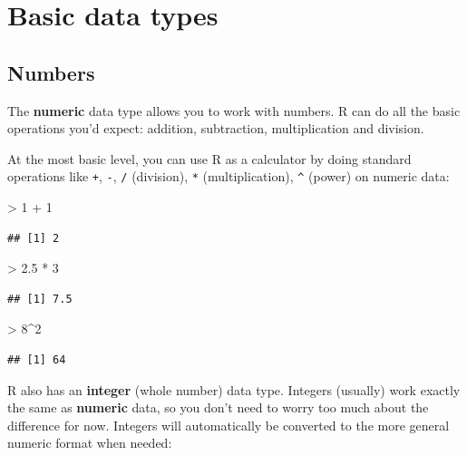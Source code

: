 \documentclass[
]{book}
\newenvironment{Shaded}{\begin{snugshade}}{\end{snugshade}}
\newcommand{\DecValTok}[1]{\textcolor[rgb]{0.00,0.00,0.81}{#1}}
\newcommand{\FloatTok}[1]{\textcolor[rgb]{0.00,0.00,0.81}{#1}}
\newcommand{\SpecialCharTok}[1]{\textcolor[rgb]{0.00,0.00,0.00}{#1}}
\begin{document}
\hypertarget{basic-data-types}{%
\section{Basic data types}\label{basic-data-types}}

\hypertarget{numbers}{%
\subsection{Numbers}\label{numbers}}

The \textbf{numeric} data type allows you to work with numbers. R can
do all the basic operations you'd expect: addition, subtraction,
multiplication and division.

At the most basic level, you can use R as a calculator by doing
standard operations like \texttt{+}, \texttt{-}, \texttt{/} (division), \texttt{*} (multiplication),
\texttt{\^{}} (power) on numeric data:

\begin{Shaded}
\begin{Highlighting}[]
\SpecialCharTok{\textgreater{}} \DecValTok{1} \SpecialCharTok{+} \DecValTok{1}
\end{Highlighting}
\end{Shaded}

\begin{verbatim}
## [1] 2
\end{verbatim}

\begin{Shaded}
\begin{Highlighting}[]
\SpecialCharTok{\textgreater{}} \FloatTok{2.5} \SpecialCharTok{*} \DecValTok{3}
\end{Highlighting}
\end{Shaded}

\begin{verbatim}
## [1] 7.5
\end{verbatim}

\begin{Shaded}
\begin{Highlighting}[]
\SpecialCharTok{\textgreater{}} \DecValTok{8}\SpecialCharTok{\^{}}\DecValTok{2}
\end{Highlighting}
\end{Shaded}

\begin{verbatim}
## [1] 64
\end{verbatim}

R also has an \textbf{integer} (whole number) data type. Integers (usually)
work exactly the same as \textbf{numeric} data, so you don't need to worry
too much about the difference for now. Integers will automatically be
converted to the more general numeric format when needed:
\end{document}
